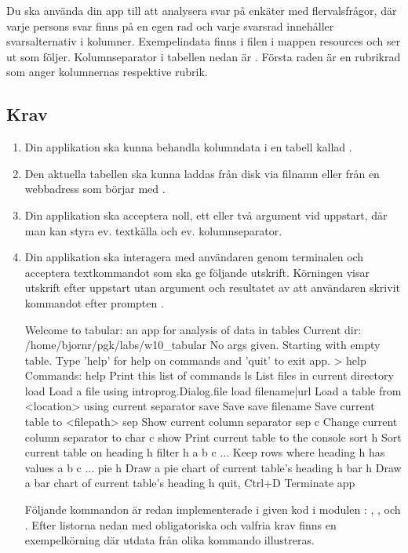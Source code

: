 Du ska använda din app till att analysera svar på enkäter med flervalsfrågor, där varje persons svar finns på en egen rad och varje svarsrad innehåller svarsalternativ i kolumner.
Exempelindata finns i filen  i mappen resources och ser ut som följer. Kolumnseparator i tabellen nedan är . Första raden är en rubrikrad som anger kolumnernas respektive rubrik.


\subsection{Krav}

\begin{enumerate}[leftmargin=*]
\item Din applikation ska kunna behandla kolumndata i en tabell kallad .

\item Den aktuella tabellen ska kunna laddas från disk via filnamn eller från en webbadress som börjar med .

\item Din applikation ska acceptera noll, ett eller två argument vid uppstart, där man kan styra ev. textkälla och ev. kolumnseparator.

\item Din applikation ska interagera med användaren genom terminalen och acceptera textkommandot  som ska ge följande utskrift. Körningen visar utskrift efter uppstart utan argument och resultatet av att användaren skrivit kommandot  efter prompten .

\begin{REPLnonum}
Welcome to tabular: an app for analysis of data in tables
Current dir: /home/bjornr/pgk/labs/w10_tabular
No args given. Starting with empty table.
Type 'help' for help on commands and 'quit' to exit app.
> help
Commands:
help                 Print this list of commands
ls                   List files in current directory
load                 Load a file using introprog.Dialog.file
load filename|url    Load a table from <location> using current separator
save                 Save
save filename        Save current table to <filepath>
sep                  Show current column separator
sep c                Change current column separator to char c
show                 Print current table to the console
sort h               Sort current table on heading h
filter h a b c ...   Keep rows where heading h has values a b c ...
pie h                Draw a pie chart of current table's heading h
bar h                Draw a bar chart of current table's heading h
quit, Ctrl+D         Terminate app
\end{REPLnonum}
Följande kommandon är redan implementerade i given kod i modulen : , ,  och . Efter listorna nedan med obligatoriska och valfria krav finns en exempelkörning där utdata från olika kommando illustreras.


\end{enumerate}
